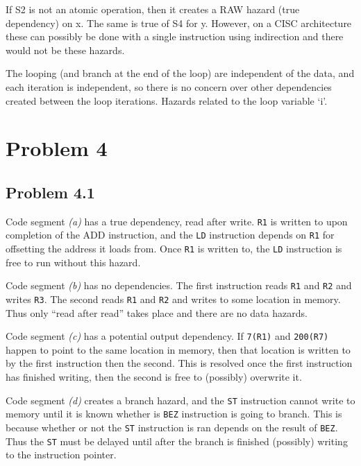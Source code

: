 \documentclass[12pt,letterpaper]{article}
\begin{document}
If S2 is not an atomic operation, then it creates a RAW hazard (true dependency) on x. The same is
true of S4 for y. However, on a CISC architecture these can possibly be done with a single
instruction using indirection and there would not be these hazards. 

The looping (and branch at the end of the loop) are independent of the data, and each iteration is
independent, so there is no concern over other dependencies created between the loop iterations.
Hazards related to the loop variable `i'.

\section*{Problem 4}



\subsection*{Problem 4.1}

Code segment \textit{(a)} has a true dependency, read after write. \lstinline{R1} is written to upon completion of the
ADD instruction, and the \lstinline{LD} instruction depends on \lstinline{R1} for offsetting the address it loads from.
Once \lstinline{R1} is written to, the \lstinline{LD} instruction is free to run without this hazard.

Code segment \textit{(b)} has no dependencies. The first instruction reads \lstinline{R1} and
\lstinline{R2} and writes \lstinline{R3}. The
second reads \lstinline{R1} and \lstinline{R2} and writes to some location in memory. Thus only ``read after read'' takes
place and there are no data hazards.

Code segment \textit{(c)} has a potential output dependency. If \lstinline{7(R1)} and
\lstinline{200(R7)} happen to point to the same
location in memory, then that location is written to by the first instruction then the second. This
is resolved once the first instruction has finished writing, then the second is free to (possibly)
overwrite it.

Code segment \textit{(d)} creates a branch hazard, and the \lstinline{ST} instruction cannot write to memory until it is
known whether is \lstinline{BEZ} instruction is going to branch. This is because whether or not the
\lstinline{ST}
instruction is ran depends on the result of \lstinline{BEZ}. Thus the \lstinline{ST} must be delayed until after the
branch is finished (possibly) writing to the instruction pointer.
\end{document}
